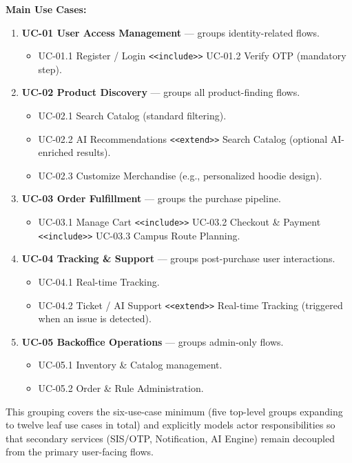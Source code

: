 \documentclass[11pt,a4paper]{article}
\begin{document}
\noindent\textbf{Main Use Cases:}
\begin{enumerate}
    \item \textbf{UC-01 User Access Management} --- groups identity-related flows.
    \begin{itemize}
        \item UC-01.1 Register / Login \texttt{<<include>>} UC-01.2 Verify OTP (mandatory step).
    \end{itemize}
    \item \textbf{UC-02 Product Discovery} --- groups all product-finding flows.
    \begin{itemize}
        \item UC-02.1 Search Catalog (standard filtering).
        \item UC-02.2 AI Recommendations \texttt{<<extend>>} Search Catalog (optional AI-enriched results).
        \item UC-02.3 Customize Merchandise (e.g., personalized hoodie design).
    \end{itemize}
    \item \textbf{UC-03 Order Fulfillment} --- groups the purchase pipeline.
    \begin{itemize}
        \item UC-03.1 Manage Cart \texttt{<<include>>} UC-03.2 Checkout \& Payment \texttt{<<include>>} UC-03.3 Campus Route Planning.
    \end{itemize}
    \item \textbf{UC-04 Tracking \& Support} --- groups post-purchase user interactions.
    \begin{itemize}
        \item UC-04.1 Real-time Tracking.
        \item UC-04.2 Ticket / AI Support \texttt{<<extend>>} Real-time Tracking (triggered when an issue is detected).
    \end{itemize}
    \item \textbf{UC-05 Backoffice Operations} --- groups admin-only flows.
    \begin{itemize}
        \item UC-05.1 Inventory \& Catalog management.
        \item UC-05.2 Order \& Rule Administration.
    \end{itemize}
\end{enumerate}

This grouping covers the six-use-case minimum (five top-level groups expanding to twelve leaf use cases in total) and explicitly models actor responsibilities so that secondary services (SIS/OTP, Notification, AI Engine) remain decoupled from the primary user-facing flows.
\end{document}
